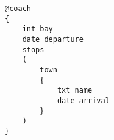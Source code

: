\begin{lstlisting}
@coach
{
    int bay
    date departure
    stops
    (
    	town
    	{
    		txt name
    		date arrival
    	}
    )
}
\end{lstlisting}
